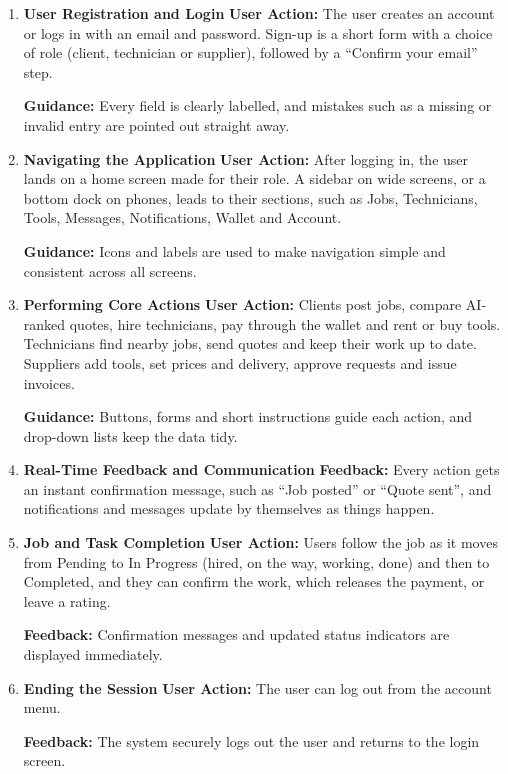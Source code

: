 \documentclass[A4paper,12pt]{report}
\theoremstyle{plain}
\theoremstyle{definition}
\theoremstyle{remark}
\numberwithin{equation}{section}
\begin{document}
\begin{enumerate}

\item \textbf{User Registration and Login}  
\textbf{User Action:} The user creates an account or logs in with an email and password. Sign-up is a short form with a choice of role (client, technician or supplier), followed by a ``Confirm your email'' step.    

\textbf{Guidance:} Every field is clearly labelled, and mistakes such as a missing or invalid entry are pointed out straight away.

\item \textbf{Navigating the Application}  
\textbf{User Action:} After logging in, the user lands on a home screen made for their role. A sidebar on wide screens, or a bottom dock on phones, leads to their sections, such as Jobs, Technicians, Tools, Messages, Notifications, Wallet and Account.    

\textbf{Guidance:} Icons and labels are used to make navigation simple and consistent across all screens.

\item \textbf{Performing Core Actions}  
\textbf{User Action:}  
Clients post jobs, compare AI-ranked quotes, hire technicians, pay through the wallet and rent or buy tools. Technicians find nearby jobs, send quotes and keep their work up to date. Suppliers add tools, set prices and delivery, approve requests and issue invoices.    

\textbf{Guidance:} Buttons, forms and short instructions guide each action, and drop-down lists keep the data tidy.

\item \textbf{Real-Time Feedback and Communication}  
\textbf{Feedback:} Every action gets an instant confirmation message, such as ``Job posted'' or ``Quote sent'', and notifications and messages update by themselves as things happen.

\item \textbf{Job and Task Completion}  
\textbf{User Action:} Users follow the job as it moves from Pending to In Progress (hired, on the way, working, done) and then to Completed, and they can confirm the work, which releases the payment, or leave a rating.    

\textbf{Feedback:} Confirmation messages and updated status indicators are displayed immediately.

\item \textbf{Ending the Session}  
\textbf{User Action:} The user can log out from the account menu.    

\textbf{Feedback:} The system securely logs out the user and returns to the login screen.

\end{enumerate}
\end{document}

